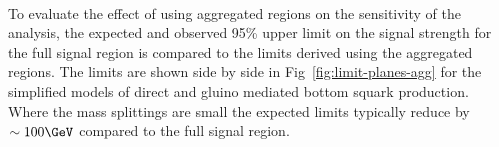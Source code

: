\begin{figure}[!tbhp]
\begin{center}
     \\
  \end{center}
\end{figure}

To evaluate the effect of using aggregated regions on the sensitivity of the \alphat analysis, 
the expected and observed 95\% upper limit on the signal strength for the full signal region 
is compared to the limits derived using the aggregated regions. The limits are shown side by side
in Fig~\ref{fig:limit-planes-agg} for the simplified models of direct and 
gluino mediated bottom squark production. Where the mass
splittings are small the expected limits typically reduce by $\sim100\GeV$ 
compared to the full signal region.

